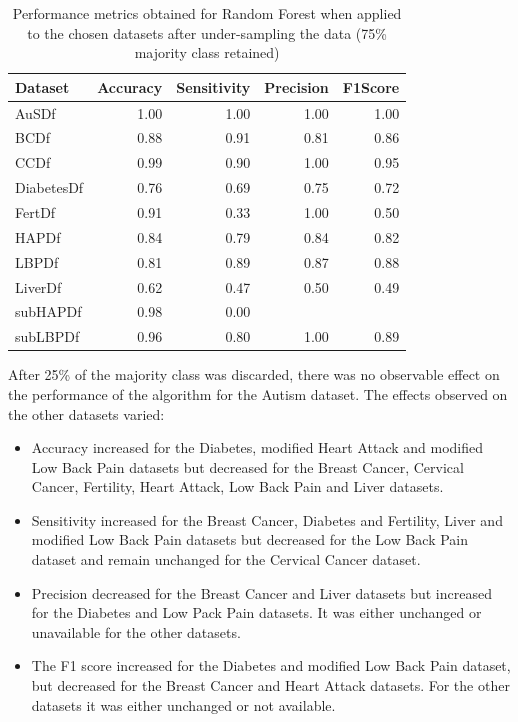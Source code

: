\begin{table}[ht]
\centering
\begin{tabular}{lrrrr}
  \hline
  \rowcolor{LightCyan}
Dataset & Accuracy & Sensitivity & Precision & F1Score \\ 
  \hline
AuSDf & 1.00 & 1.00 & 1.00 & 1.00 \\ 
  BCDf & 0.88 & 0.91 & 0.81 & 0.86 \\ 
  CCDf & 0.99 & 0.90 & 1.00 & 0.95 \\ 
  DiabetesDf & 0.76 & 0.69 & 0.75 & 0.72 \\ 
  FertDf & 0.91 & 0.33 & 1.00 & 0.50 \\ 
  HAPDf & 0.84 & 0.79 & 0.84 & 0.82 \\ 
  LBPDf & 0.81 & 0.89 & 0.87 & 0.88 \\ 
  LiverDf & 0.62 & 0.47 & 0.50 & 0.49 \\ 
  subHAPDf & 0.98 & 0.00 &  &  \\ 
  subLBPDf & 0.96 & 0.80 & 1.00 & 0.89 \\ 
   \hline
\end{tabular}
\caption{Performance metrics obtained for Random Forest when applied to the chosen datasets after under-sampling the data (75\% majority class retained)}
\end{table}

After 25\% of the majority class was discarded, there was no observable effect on the performance of the algorithm for the Autism dataset. The effects observed on the other datasets varied:
\begin{itemize}
    \item Accuracy increased for the Diabetes, modified Heart Attack and modified Low Back Pain datasets but decreased for the Breast Cancer, Cervical Cancer, Fertility, Heart Attack, Low Back Pain and Liver datasets.
    \item Sensitivity increased for the Breast Cancer, Diabetes and Fertility, Liver and modified Low Back Pain datasets but decreased for the Low Back Pain dataset and remain unchanged for the Cervical Cancer dataset.
    \item Precision decreased for the Breast Cancer and Liver datasets but increased for the Diabetes and Low Pack Pain datasets. It was either unchanged or unavailable for the other datasets.
    \item The F1 score increased for the Diabetes and modified Low Back Pain dataset, but decreased for the Breast Cancer and Heart Attack datasets. For the other datasets it was either unchanged or not available.
\end{itemize}

